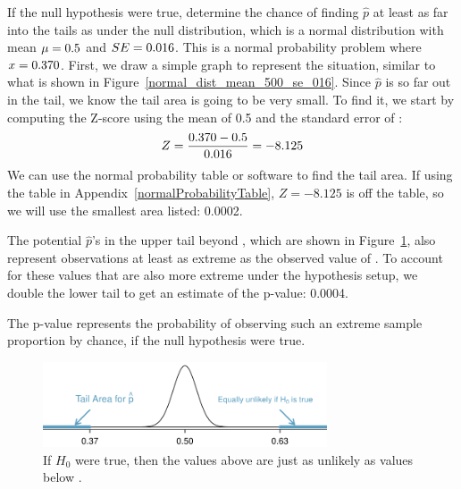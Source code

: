 \begin{example}{If the null hypothesis were true,
    determine the chance of finding $\hat{p}$ at least
    as far into the tails as \pewcoalpollprop{}
    under the null distribution,
    which is a normal distribution with mean
    $\mu = 0.5{}$
    and $SE = 0.016{}$.}
%
  This is a normal probability problem where
  $x = 0.370{}$.
  First, we draw a simple graph to represent the situation,
  similar to what is shown in
  Figure~\ref{normal_dist_mean_500_se_016}.
  Since $\hat{p}$ is so far out in the tail, we know the
  tail area is going to be very small. To find it, we start
  by computing the Z-score using the mean of 0.5 and the
  standard error of \pewcoalpollnullse{}:
  \begin{align*}
  Z = \frac{0.370{} - 0.5}{0.016{}} = -8.125 
  \end{align*}
  We can use the normal probability table or software to find
  the tail area.
  If using the table in
  Appendix~\ref{normalProbabilityTable},
  $Z = -8.125$ is off the table, so we will
  use the smallest area listed: 0.0002.

  The potential $\hat{p}$'s in the upper tail beyond
  \pewcoalpollpropcomplement{}, which are shown
  in Figure~\ref{normal_dist_mean_500_se_016_with_upper},
  also represent observations at least as extreme as
  the observed value of \pewcoalpollprop{}.
  To account for these values that are also more
  extreme under the hypothesis setup,
  we double the lower tail to get an estimate
  of the p-value: 0.0004.

  The p-value represents the probability of observing
  such an extreme sample proportion by chance, if the null
  hypothesis were true.
\end{example}

\begin{figure}[hht]
\centering
\includegraphics[width=0.75\textwidth]{ch_foundations_for_inf/figures/normal_dist_mean_500_se_016/normal_dist_mean_500_se_016_with_upper}
\caption{
  If $H_0$ were true, then the values above
  \pewcoalpollpropcomplement{} are just
  as unlikely as values below \pewcoalpollprop{}.}
\label{normal_dist_mean_500_se_016_with_upper}
\end{figure}




